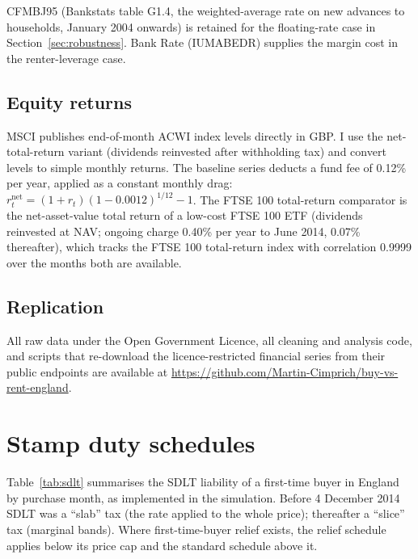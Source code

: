 \begin{appendices}
CFMBJ95 (Bankstats table G1.4, the weighted-average rate on new advances to households, January 2004 onwards) is retained for the floating-rate case in Section~\ref{sec:robustness}. Bank Rate (IUMABEDR) supplies the margin cost in the renter-leverage case.

\subsection*{Equity returns}

MSCI publishes end-of-month ACWI index levels directly in GBP. I use the net-total-return variant (dividends reinvested after withholding tax) and convert levels to simple monthly returns. The baseline series deducts a fund fee of 0.12\% per year, applied as a constant monthly drag: $r^{\text{net}}_t = (1 + r_t)(1 - 0.0012)^{1/12} - 1$. The FTSE 100 total-return comparator is the net-asset-value total return of a low-cost FTSE 100 ETF (dividends reinvested at NAV; ongoing charge 0.40\% per year to June 2014, 0.07\% thereafter), which tracks the FTSE 100 total-return index with correlation 0.9999 over the months both are available.

\subsection*{Replication}

All raw data under the Open Government Licence, all cleaning and analysis code, and scripts that re-download the licence-restricted financial series from their public endpoints are available at \url{https://github.com/Martin-Cimprich/buy-vs-rent-england}.

\section{Stamp duty schedules}
\label{app:sdlt}

Table~\ref{tab:sdlt} summarises the SDLT liability of a first-time buyer in England by purchase month, as implemented in the simulation. Before 4 December 2014 SDLT was a ``slab'' tax (the rate applied to the whole price); thereafter a ``slice'' tax (marginal bands). Where first-time-buyer relief exists, the relief schedule applies below its price cap and the standard schedule above it.


\end{appendices}
